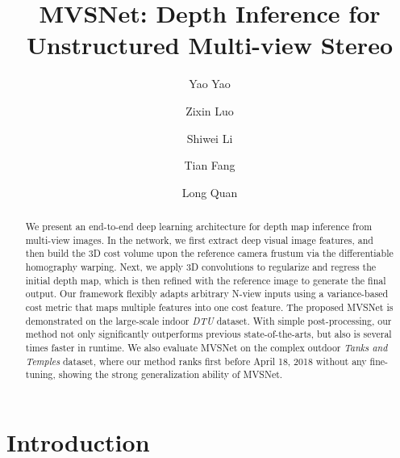 \documentclass[runningheads]{llncs}
\begin{document}
\title{MVSNet: Depth Inference for \\Unstructured Multi-view Stereo} 






\author{
Yao Yao \and Zixin Luo \and Shiwei Li \and Tian Fang \and  Long Quan
}








\maketitle        


\begin{abstract}
We present an end-to-end deep learning architecture for depth map inference from multi-view images. In the network, we first extract deep visual image features, and then build the 3D cost volume upon the reference camera frustum via the differentiable homography warping. Next, we apply 3D convolutions to regularize and regress the initial depth map, which is then refined with the reference image to generate the final output. Our framework flexibly adapts arbitrary N-view inputs using a variance-based cost metric that maps multiple features into one cost feature. The proposed MVSNet is demonstrated on the large-scale indoor \textit{DTU} dataset. With simple post-processing, our method not only significantly outperforms previous state-of-the-arts, but also is several times faster in runtime. We also evaluate MVSNet on the complex outdoor \textit{Tanks and Temples} dataset, where our method ranks first before April 18, 2018 without any fine-tuning, showing the strong generalization ability of MVSNet.
\end{abstract}




\section{Introduction}
\end{document}
